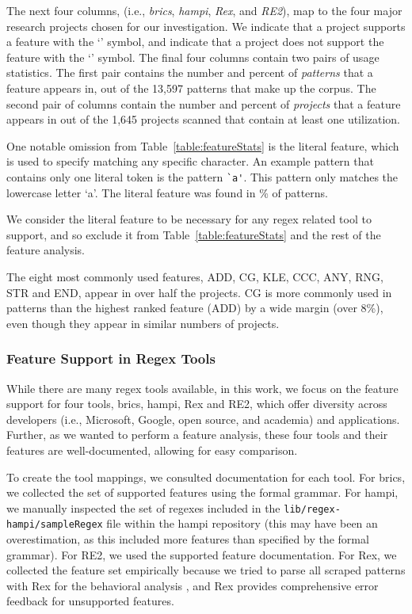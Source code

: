 The next four columns, (i.e., \emph{brics}, \emph{hampi}, \emph{Rex}, and \emph{RE2}), map to the four major research projects chosen for our investigation.  We indicate that a project supports a feature with the `\yes' symbol, and indicate that a project does not support the feature with the `\no' symbol.
The final four columns contain two pairs of usage statistics.  The first pair contains the number and percent of \emph{patterns} that a feature appears in, out of the 13,597 patterns that make up the corpus.  The second pair of columns contain the number and percent of \emph{projects} that a feature appears in out of the 1,645 projects scanned that contain at least one utilization.

One notable omission from Table~\ref{table:featureStats} is the literal feature, which is used  to specify matching any specific character.  An example pattern that contains only one literal token is the pattern \verb!`a'!.  This pattern only matches the lowercase letter `a'.  The literal feature was found in \% of patterns.

We consider the literal feature to be necessary for any regex related tool to support, and so exclude it from Table~\ref{table:featureStats} and the rest of the feature analysis.

The eight most commonly used features, ADD, CG, KLE, CCC, ANY, RNG, STR and END,
appear in over half the projects.
CG is more commonly used in patterns than the highest ranked feature (ADD) by a wide margin (over 8\%), even though they appear in similar numbers of projects.

\subsubsection{Feature Support in Regex Tools}
While there are many regex tools available, in this work, we focus on the feature support for  four tools, brics, hampi, Rex and RE2, which offer diversity across developers (i.e., Microsoft, Google, open source, and academia) and applications. Further, as we wanted to perform a feature analysis, these four tools and their features are well-documented, allowing for easy comparison.

To create the tool mappings, we consulted documentation for each tool. For brics, we collected the set of supported features using the formal grammar.  For hampi, we manually inspected the set of regexes included in the {\tt lib/regex-hampi/sampleRegex} file within the hampi repository (this may have been an overestimation, as this included more features than specified by the formal grammar).  For RE2, we used the  supported feature documentation.  For Rex, we collected the feature set empirically because we tried to parse all scraped patterns with Rex for the behavioral analysis
, and Rex provides comprehensive error feedback for unsupported features.


